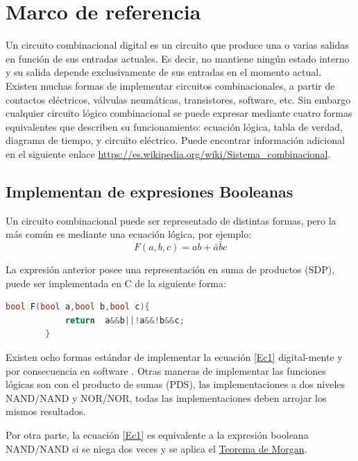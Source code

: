 \section{Marco de referencia}

Un circuito combinacional digital es un circuito que produce una o varias salidas en función de sus entradas actuales. Es decir, no mantiene ningún estado interno y su salida depende exclusivamente de sus entradas en el momento actual.
Existen muchas formas de implementar circuitos combinacionales, a partir de contactos eléctricos, válvulas neumáticas, transistores, software, etc. Sin embargo cualquier circuito lógico combinacional se puede expresar mediante cuatro formas equivalentes que describen su funcionamiento: ecuación lógica, tabla de verdad, diagrama de tiempo, y circuito eléctrico. 
Puede encontrar información adicional en el siguiente enlace \href{https://es.wikipedia.org/wiki/Sistema_combinacional}{https://es.wikipedia.org/wiki/Sistema\_combinacional}.   

\subsection{Implementan de expresiones Booleanas }

Un circuito combinacional  puede ser representado de distintas formas, pero la más común es mediante una ecuación lógica, por ejemplo: 
\begin{equation}
\label{Ec1}
F(a,b,c)=ab+\bar{a}\bar{b}c
\end{equation}

La expresión anterior posee una representación en suma de productos (SDP), puede ser implementada en C de la siguiente forma:

		 \begin{lstlisting}[language=C++]
		bool F(bool a,bool b,bool c){
			return  a&&b||!a&&!b&&c;
		}
		\end{lstlisting} 

Existen ocho formas estándar de implementar la ecuación \eqref{Ec1} digital-mente y por consecuencia en software . Otras maneras de implementar las funciones lógicas  son con el producto de sumas (PDS), las implementaciones a dos niveles  NAND/NAND y NOR/NOR, todas las implementaciones deben arrojar los mismos resultados.

Por otra parte, la ecuación \eqref{Ec1} es equivalente a la expresión booleana  NAND/NAND si se niega dos veces y se aplica el \href{https://es.wikipedia.org/wiki/Leyes_de_De_Morgan}{Teorema de Morgan}.


